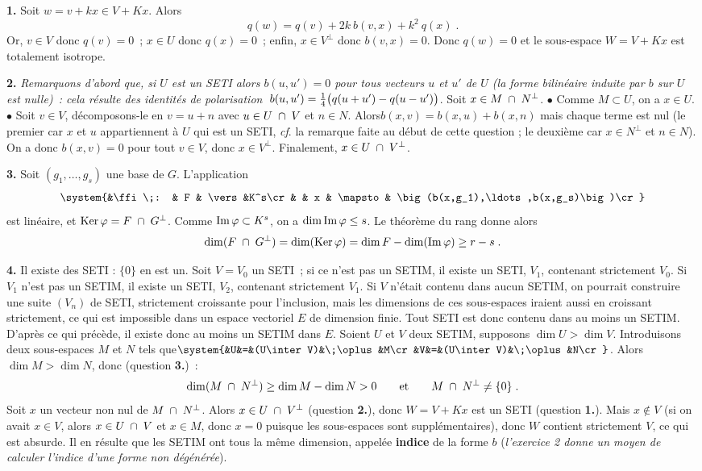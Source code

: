 \documentclass{article}
\begin{document}
\bsk
\cl{- - - - - - - - - - - - - - - - - - - - - - - - - - - - - - -}
\bsk

{\bf 1.} Soit $w=v+kx\in V+Kx$. Alors\vv
$$q(w)=q(v)+2k\>b(v,x)+k^2\>q(x)\;.$$
Or, $v\in V$ donc $q(v)=0$~; $x\in U$ donc $q(x)=0$~; enfin, $x\in V^\perp$
donc $b(v,x)=0$. Donc $q(w)=0$ et le sous-espace $W=V+Kx$ est totalement
isotrope.

\msk
{\bf 2.} {\it Remarquons d'abord que, si $U$ est un SETI alors $b(u,u')=0$
pour tous vecteurs $u$ et $u'$ de $U$ (la forme bilin\'eaire induite par $b$ sur $U$ est nulle)~: cela r\'esulte des identit\'es de
polarisation $\;b(u,u')={1\over4}\big(q(u+u')-q(u-u')\big)$}.\msk\sect
Soit $x\in M\;\cap\; N^\perp$.\ssk\sect
$\bullet$ Comme $M\subset U$, on a $x\in U$.\ssk\sect
$\bullet$ Soit $v\in V$, d\'ecomposons-le en $v=u+n$ avec $u\in U\;\cap\; V$
  et $n\in N$. Alors\break $b(x,v)=b(x,u)+b(x,n)$ mais chaque terme est nul
  (le premier car $x$ et $u$ appartiennent \`a $U$ qui est un SETI, {\it cf}.
  la remarque faite au d\'ebut de cette question ; le deuxi\`eme car $x\in N^\perp$
  et $n\in N$). On a donc $b(x,v)=0$ pour tout $v\in V$, donc $x\in V^\perp$.\msk
  \sect
Finalement, $x\in U\;\cap\; V^\perp$.

\msk
{\bf 3.} Soit $(g_1,\ldots,g_s)$ une base de $G$. L'application\vv
$$\system{&\ffi\;: & F & \vers &K^s\cr
          &        & x & \mapsto & \big(b(x,g_1),\ldots,b(x,g_s)\big)\cr}$$
est lin\'eaire, et $\mathop{\rm Ker}\nolimits\varphi=F\;\cap\; G^\perp$. Comme $\mathop{\rm Im}\nolimits\varphi\subset K^s$,
on a $\dim\mathop{\rm Im}\nolimits\varphi\leq s$. Le th\'eor\`eme du rang donne alors\vv
$$\dim(F\;\cap\; G^\perp)=\dim(\mathop{\rm Ker}\nolimits\varphi)=\dim F-\dim(\mathop{\rm Im}\nolimits \varphi)\geq r-s\;.$$

\par
{\bf 4.} Il existe des SETI : $\{0\}$ en est un.\ssk\sect
Soit $V=V_0$ un SETI~; si ce n'est pas un SETIM, il existe un SETI, $V_1$,
contenant strictement $V_0$. Si $V_1$ n'est pas un SETIM, il existe un SETI,
$V_2$, contenant strictement $V_1$. Si $V$ n'\'etait contenu dans aucun SETIM,
on pourrait construire une suite $(V_n)$ de SETI, strictement croissante
pour l'inclusion, mais les dimensions de ces sous-espaces iraient aussi en
croissant strictement, ce qui est impossible dans un espace vectoriel $E$
de dimension finie. Tout SETI est donc contenu dans au moins un SETIM.
\msk\sect
D'apr\`es ce qui pr\'ec\`ede, il existe donc au moins un SETIM dans $E$. Soient
$U$ et $V$ deux SETIM, supposons $\dim U>\dim V$. Introduisons deux sous-espaces
$M$ et $N$ tels que\break\new $\system{&U&=&(U\inter V)&\;\oplus&M\cr
&V&=&(U\inter V)&\;\oplus&N\cr}$. Alors $\dim M>\dim N$, donc (question {\bf 3.})~:
$$\dim(M\;\cap\; N^\perp)\geq\dim M-\dim N>0\qquad{\rm et}\qquad M\;\cap\; N^\perp
  \not=\{0\}\;.$$\sect
Soit $x$ un vecteur non nul de $M\;\cap\; N^\perp$. Alors $x\in U\;\cap\; V^\perp$
(question {\bf 2.}), donc $W=V+Kx$ est un SETI (question {\bf 1.}).
Mais $x\not\in V$ (si on avait $x\in V$, alors $x\in U\;\cap\; V$ et $x\in M$,
donc $x=0$ puisque les sous-espaces sont suppl\'ementaires), donc $W$ contient
strictement $V$, ce qui est absurde.\ssk\sect
Il en r\'esulte que les SETIM ont tous la m\^eme dimension, appel\'ee {\bf indice} de la forme $b$ ({\it l'exercice 2 donne un moyen de calculer l'indice d'une forme non d\'eg\'en\'er\'ee}).
\end{document}
